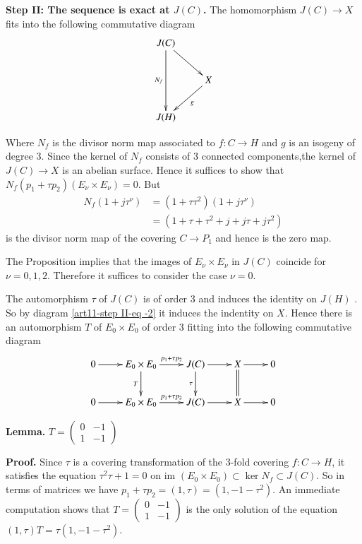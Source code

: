 \medskip
\noindent
{\bfseries Step II: The sequence is exact at $J(C)$.} The homomorphism $J(C) \rightarrow X $ fits into the following commutative diagram
\begin{equation}\label{art11-step II-eq -2}
\vcenter{
\xymatrix{
J(C)\ar[dr]\ar[dd]_-{N_{f}} & \\
    &X \ar[dl]^-{g}\\
J(H)  &     
}}
\end{equation}


Where $N_{f}$ is the divisor norm map associated to $f: C\rightarrow H$ and $g$ is an isogeny of degree 3. Since the kernel of $N_{f}$ consists of 3 connected components,the kernel of $J(C)\rightarrow X$ is an abelian surface. Hence it suffices to show that $N_{f}(p_{1} + \tau p_{2})(E_{\nu} \times E_{\nu})=0$. But
\begin{align*}
N_{f}(1 + j\tau^{\nu})&= (1 +\tau \tau^{2})(1 + j\tau^{\nu})\\
                      &=(1+ \tau + \tau^{2} + j + j\tau + j\tau^{2})
\end{align*}
is the divisor norm map of the covering $C\rightarrow P_{1}$ and hence is the zero map.

The Proposition implies that the images of $E_{\nu} \times E_{\nu}$ in $J(C)$ coincide for $\nu =0,1,2$. Therefore it suffices to consider the case $\nu=0$.

The automorphism $\tau$ of $J(C)$ is of order 3 and induces the identity on $J(H)$ . So by diagram \eqref{art11-step II-eq -2} it induces the indentity on $X$. Hence there is an automorphism $T$ of $ E_{0} \times E_{0}$ of order 3 fitting into the following commutative diagram
$$
\xymatrix{
0 \ar[r] & E_{0}\times E_{0} \ar[d]_-{T} \ar[r]^-{p_{1}+\tau p_{2}}& J(C)\ar[d]_-{\tau}\ar[r] & X\ar@{=}[d] \ar[r] & 0\\
0 \ar[r] &E_{0}\times E_{0}  \ar[r]^-{p_{1}+\tau p_{2}} & J(C)\ar[r] & X \ar[r] & 0
}
$$ 

\medskip
\noindent
{\bfseries {} Lemma.\label{art11-lemma-5.3}}
$T=\begin{pmatrix}
0 & -1\\
1 & -1
\end{pmatrix}
$

\medskip
\noindent
{\bfseries Proof.} Since $\tau$ is a covering transformation of the 3-fold covering $f: C\rightarrow H$, it satisfies the equation $\tau^{2} \tau + 1 =0$ on im $(E_{0}\times E_{0})\subset \ker N_{f} \subset J(C)$. So in terms of matrices we have $p_{1} + \tau p_{2} = (1, \tau)=(1,-1-\tau^{2})$. An immediate computation shows that
$T = \begin{pmatrix}
0 & -1\\
1 & -1
\end{pmatrix}
$ is the only solution of the equation $(1,\tau)T=\tau(1,-1-\tau^{2})$.

